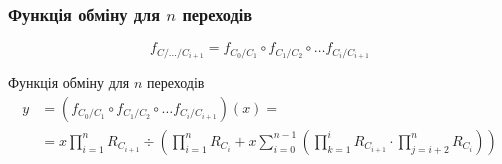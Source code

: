 \documentclass{beamer}
\begin{document}
\begin{frame}\frametitle{Функція обміну для $n$ переходів}
	\begin{equation*}
		f_{C/\ldots/C_{i+1}} = f_{C_{0}/C_{1}} \circ f_{C_{1}/C_{2}} \circ \ldots f_{C_{i}/C_{i+1}}
	\end{equation*}
	\pause{}
	\begin{block}{Функція обміну для $n$ переходів}
		\begin{equation*}
			\begin{aligned}
				y & = (f_{C_{0}/C_{1}} \circ f_{C_{1}/C_{2}} \circ \ldots f_{C_{i}/C_{i+1}})(x) =                                                                                                \\
				  & = x \prod_{i=1}^n R_{C_{i+1}} \div \left( \prod_{i=1}^{n} R_{C_{i}} + x \sum_{i=0}^{n-1} \left( \prod_{k=1}^i R_{C_{i+1}} \cdot \prod_{j=i+2}^{n}  R_{C_{i}} \right) \right)
			\end{aligned}
		\end{equation*}
	\end{block}
\end{frame}
\end{document}
